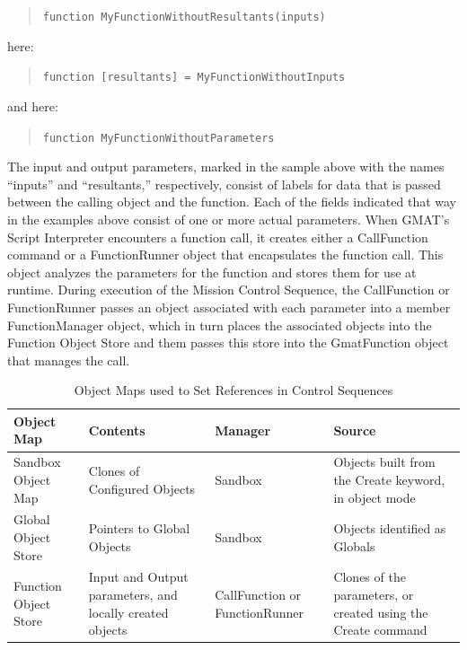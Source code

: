 \begin{quote}
\texttt{function MyFunctionWithoutResultants(inputs)}
\end{quote}
\noindent here:
\begin{quote}
\texttt{function [resultants] = MyFunctionWithoutInputs}
\end{quote}
\noindent and here:
\begin{quote}
\texttt{function MyFunctionWithoutParameters}
\end{quote}

\noindent The input and output parameters, marked in the sample above with the names ``inputs'' and
``resultants,'' respectively, consist of labels for data that is passed between the calling object
and the function.  Each of the fields indicated that way in the examples above consist of one or
more actual parameters.  When GMAT's Script Interpreter encounters a function call, it creates
either a CallFunction command or a FunctionRunner object that encapsulates the function call.  This
object analyzes the parameters for the function and stores them for use at runtime.  During
execution of the Mission Control Sequence, the CallFunction or FunctionRunner passes an object
associated with each parameter into a member FunctionManager object, which in turn places the
associated objects into the Function Object Store and them passes this store into the GmatFunction
object that manages the call.

\begin{table}[htb]
\begin{center}
\caption{\label{table:ObjectMaps}Object Maps used to Set References in Control Sequences}
\setlength\extrarowheight{2pt}
\begin{tabular}{|p{1.3in}|p{1.4in}|p{0.8in}|p{2in}|}
\hline
Object Map & Contents & Manager & Source \\
\hline
\hline
Sandbox Object Map & Clones of Configured Objects & Sandbox & Objects built from the Create keyword,
in object mode \\
Global Object Store & Pointers to Global Objects & Sandbox & Objects identified as Globals \\
Function Object Store & Input and Output parameters, and locally created
objects & CallFunction or FunctionRunner & Clones of the parameters, or created using the
Create command\\
\hline
\end{tabular}
\end{center}
\end{table}

